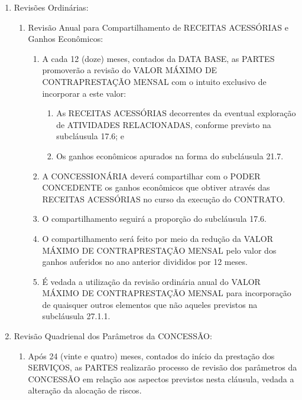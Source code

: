 \documentclass[a4paper,11pt]{report} %
\begin{document}
\begin{enumerate}
\item \label{itm:ETQU} Revisões Ordinárias:

\begin{enumerate}[label*=\arabic*.]
\item \label{itm:MSYW} Revisão Anual para Compartilhamento de RECEITAS ACESSÓRIAS e Ganhos Econômicos:

\begin{enumerate}[label*=\arabic*.]
\item \label{itm:UBDR} A cada 12 (doze) meses, contados da DATA BASE, as PARTES promoverão a revisão do VALOR MÁXIMO DE CONTRAPRESTAÇÃO MENSAL com o intuito exclusivo de incorporar a este valor:

\begin{enumerate}[label*=\arabic*.]
\item \label{itm:6MLC} As RECEITAS ACESSÓRIAS decorrentes da eventual exploração de ATIVIDADES RELACIONADAS, conforme previsto na subcláusula 17.6; e
\item \label{itm:6R8K} Os ganhos econômicos apurados na forma do subcláusula 21.7.
\end{enumerate}

\item \label{itm:8B2K} A CONCESSIONÁRIA deverá compartilhar com o PODER CONCEDENTE os ganhos econômicos que obtiver através das RECEITAS ACESSÓRIAS no curso da execução do CONTRATO. 

\item \label{itm:N5P7} O compartilhamento seguirá a proporção do subcláusula 17.6. 

\item \label{itm:7JYB} O compartilhamento será feito por meio da redução da VALOR MÁXIMO DE CONTRAPRESTAÇÃO MENSAL pelo valor dos ganhos auferidos no ano anterior divididos por 12 meses. 

\item \label{itm:6FPS} É vedada a utilização da revisão ordinária anual do VALOR MÁXIMO DE CONTRAPRESTAÇÃO MENSAL para incorporação de quaisquer outros elementos que não aqueles previstos na subcláusula 27.1.1.
\end{enumerate}
\end{enumerate}

\item \label{itm:XD5C} Revisão Quadrienal dos Parâmetros da CONCESSÃO:

\begin{enumerate}[label*=\arabic*.]
\item \label{itm:DK4D} Após 24 (vinte e quatro) meses, contados do início da prestação dos SERVIÇOS, as PARTES realizarão processo de revisão dos parâmetros da CONCESSÃO em relação aos aspectos previstos nesta cláusula, vedada a alteração da alocação de riscos.


\end{enumerate}
\end{enumerate}
\end{document}
